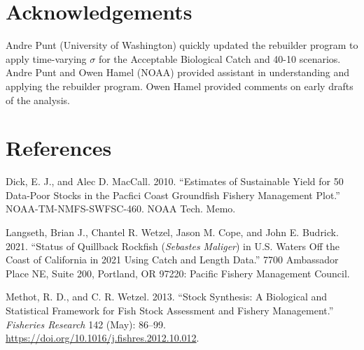 \documentclass[11pt,
  english,
  a4paper,
]{article}
\begin{document}
\hypertarget{acknowledgements}{%
\section{Acknowledgements}\label{acknowledgements}}

\leavevmode\tagmcend\tagstructend


Andre Punt (University of Washington) quickly updated the rebuilder program to apply time-varying {\(\sigma\)\leavevmode\tagmcend\tagstructend} for the Acceptable Biological Catch and 40-10 scenarios. Andre Punt and Owen Hamel (NOAA) provided assistant in understanding and applying the rebuilder program. Owen Hamel provided comments on early drafts of the analysis.

\leavevmode\tagmcend\tagstructend\par

\clearpage


\hypertarget{references}{%
\section{References}\label{references}}

\leavevmode\tagmcend\tagstructend


\hypertarget{refs}{}
\leavevmode\hypertarget{ref-DickandMacCall_dbsra_2010}{}%
Dick, E. J., and Alec D. MacCall. 2010. ``Estimates of Sustainable Yield for 50 Data-Poor Stocks in the Pacfici Coast Groundfish Fishery Management Plot.'' NOAA-TM-NMFS-SWFSC-460. NOAA Tech. Memo.

\leavevmode\hypertarget{ref-Langseth_status_2021}{}%
Langseth, Brian J., Chantel R. Wetzel, Jason M. Cope, and John E. Budrick. 2021. ``Status of Quillback Rockfish (\emph{Sebastes Maliger}) in U.S. Waters Off the Coast of California in 2021 Using Catch and Length Data.'' 7700 Ambassador Place NE, Suite 200, Portland, OR 97220: Pacific Fishery Management Council.

\leavevmode\hypertarget{ref-methot_stock_2013}{}%
Methot, R. D., and C. R. Wetzel. 2013. ``Stock Synthesis: A Biological and Statistical Framework for Fish Stock Assessment and Fishery Management.'' \emph{Fisheries Research} 142 (May): 86--99. \url{https://doi.org/10.1016/j.fishres.2012.10.012}.
\end{document}
